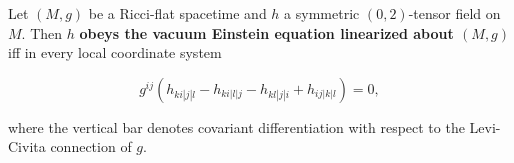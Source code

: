 Let $(M, g)$ be a Ricci-flat spacetime and $h$ a symmetric $(0, 2)$-tensor field on $M$. Then $h$ \textbf{obeys the vacuum Einstein equation linearized about $(M, g)$} iff in every local coordinate system

$$g^{ij} \left( h_{ki|j|l} - h_{ki|l|j} - h_{kl|j|i} + h_{ij|k|l} \right) = 0,$$

where the vertical bar denotes covariant differentiation with respect to the Levi-Civita connection of $g$.
